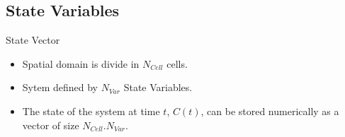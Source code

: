 \documentclass[final,xcolor=dvipsnames]{beamer}
\begin{document}
      \subsection{State Variables}
      \begin{frame}
	\begin{block}{State Vector}
	  \begin{itemize}
	    \item Spatial domain is divide in $N_{Cell}$ cells.
	    \item Sytem defined by $N_{Var}$ State Variables. 
	    \item The state of the system at time $t$, $C(t)$, can be stored numerically as a vector of size $N_{Cell}.N_{Var}$.
	  \end{itemize}
	\end{block}
	
	
      \end{frame}
      
\end{document}

